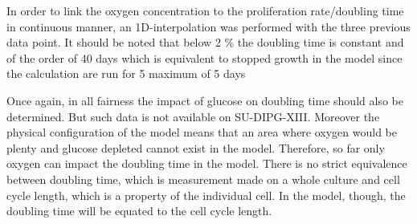\documentclass[11pt,a4paper]{article}
\begin{document}
In order to link the oxygen concentration to the proliferation rate/doubling time in continuous manner, an 1D-interpolation was performed  with the three previous data point. It should be noted that below 2 \% the doubling time is constant and of the order of 40 days which is equivalent to stopped growth in the model since the calculation are run for 5 maximum of 5 days 
%
%    
%     
%     

Once again, in all fairness the impact of glucose on doubling time should also be determined. But such data is not available on SU-DIPG-XIII. Moreover the physical configuration of the model means that an area where oxygen would be plenty and glucose depleted cannot exist in the model. Therefore, so far only oxygen can impact the doubling time in the model. There is no strict equivalence between doubling time, which is measurement made on a whole culture and cell cycle length, which is a property of the individual cell. In the model, though, the doubling time will be equated to the cell cycle length.
\end{document}
